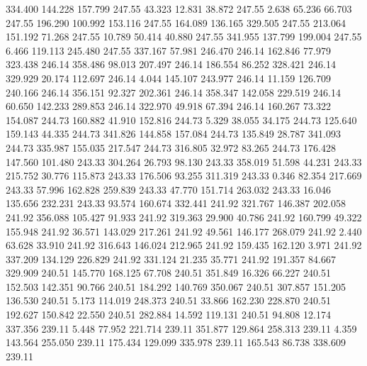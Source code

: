  334.400  144.228  157.799       247.55
  43.323   12.831   38.872       247.55
   2.638   65.236   66.703       247.55
 196.290  100.992  153.116       247.55
 164.089  136.165  329.505       247.55
 213.064  151.192   71.268       247.55
  10.789   50.414   40.880       247.55
 341.955  137.799  199.004       247.55
   6.466  119.113  245.480       247.55
 337.167   57.981  246.470       246.14
 162.846   77.979  323.438       246.14
 358.486   98.013  207.497       246.14
 186.554   86.252  328.421       246.14
 329.929   20.174  112.697       246.14
   4.044  145.107  243.977       246.14
  11.159  126.709  240.166       246.14
 356.151   92.327  202.361       246.14
 358.347  142.058  229.519       246.14
  60.650  142.233  289.853       246.14
 322.970   49.918   67.394       246.14
 160.267   73.322  154.087       244.73
 160.882   41.910  152.816       244.73
   5.329   38.055   34.175       244.73
 125.640  159.143   44.335       244.73
 341.826  144.858  157.084       244.73
 135.849   28.787  341.093       244.73
 335.987  155.035  217.547       244.73
 316.805   32.972   83.265       244.73
 176.428  147.560  101.480       243.33
 304.264   26.793   98.130       243.33
 358.019   51.598   44.231       243.33
 215.752   30.776  115.873       243.33
 176.506   93.255  311.319       243.33
   0.346   82.354  217.669       243.33
  57.996  162.828  259.839       243.33
  47.770  151.714  263.032       243.33
  16.046  135.656  232.231       243.33
  93.574  160.674  332.441       241.92
 321.767  146.387  202.058       241.92
 356.088  105.427   91.933       241.92
 319.363   29.900   40.786       241.92
 160.799   49.322  155.948       241.92
  36.571  143.029  217.261       241.92
  49.561  146.177  268.079       241.92
   2.440   63.628   33.910       241.92
 316.643  146.024  212.965       241.92
 159.435  162.120    3.971       241.92
 337.209  134.129  226.829       241.92
 331.124   21.235   35.771       241.92
 191.357   84.667  329.909       240.51
 145.770  168.125   67.708       240.51
 351.849   16.326   66.227       240.51
 152.503  142.351   90.766       240.51
 184.292  140.769  350.067       240.51
 307.857  151.205  136.530       240.51
   5.173  114.019  248.373       240.51
  33.866  162.230  228.870       240.51
 192.627  150.842   22.550       240.51
 282.884   14.592  119.131       240.51
  94.808   12.174  337.356       239.11
   5.448   77.952  221.714       239.11
 351.877  129.864  258.313       239.11
   4.359  143.564  255.050       239.11
 175.434  129.099  335.978       239.11
 165.543   86.738  338.609       239.11
